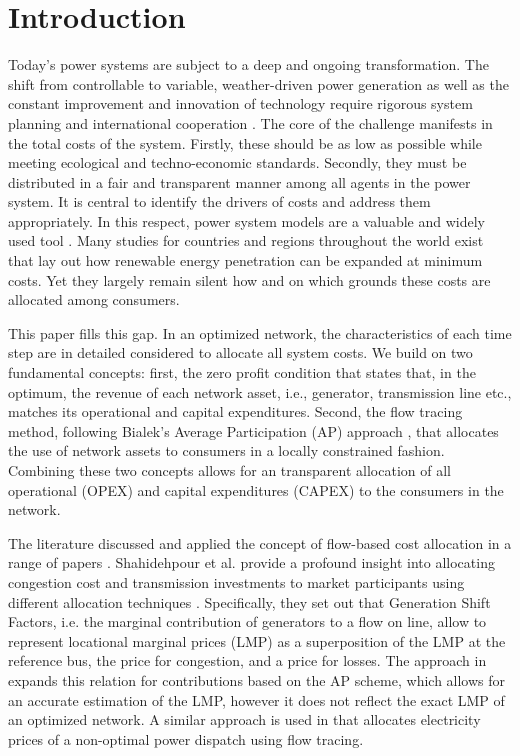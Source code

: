 \documentclass[11pt,twocolumn]{article}
\begin{document}
\section{Introduction}

Today's power systems are subject to a deep and ongoing transformation. The shift from controllable to variable, weather-driven power generation as well as the constant improvement and innovation of technology require rigorous system planning and international cooperation \cite{pfenninger_energy_2014,schlachtberger_benefits_2017}. The core of the challenge manifests in the total costs of the system. Firstly, these should be as low as possible while meeting ecological and techno-economic standards. Secondly, they must be distributed in a fair and transparent manner among all agents in the power system. It is central to identify the drivers of costs and address them appropriately.  
In this respect, power system models are a valuable and widely used tool \cite{pfenninger_energy_2014,bazmi_sustainable_2011,pereira_generation_2017,brown_sectoral_2019}. Many studies for countries and regions throughout the world exist that lay out how renewable energy penetration can be expanded at minimum costs. Yet they largely remain silent how and on which grounds these costs are allocated among consumers. 

This paper fills this gap. In an optimized network, the characteristics of each time step are in detailed considered to allocate all system costs. We build on two fundamental concepts: first, the zero profit condition that states that, in the optimum, the revenue of each network asset, i.e., generator, transmission line etc., matches its operational and capital expenditures. Second, the flow tracing method, following Bialek’s Average Participation (AP) approach \cite{bialek_tracing_1996}, that allocates the use of network assets to consumers in a locally constrained fashion. 
Combining these two concepts allows for an transparent allocation of all operational (OPEX) and capital expenditures (CAPEX) to the consumers in the network. 
 
The literature discussed and applied the concept of flow-based cost allocation in a range of papers \cite{galiana_transmission_2003,shahidehpour_market_2002,meng_investigation_2007,schafer_allocation_2017,nikoukar_transmission_2012,arabali_pricing_2012,wu_locational_2005}. Shahidehpour et al. provide a profound insight into allocating congestion cost and transmission investments to market participants using different allocation techniques \cite{shahidehpour_market_2002}. Specifically, they set out that Generation Shift Factors, i.e. the marginal contribution of generators to a flow on line, allow to represent locational marginal prices (LMP) as a superposition of the LMP at the reference bus, the price for congestion, and a price for losses. The approach in \cite{meng_investigation_2007} expands this relation for contributions based on the AP scheme, which allows for an accurate estimation of the LMP, however it does not reflect the exact LMP of an optimized network. A similar approach is used in \cite{schafer_allocation_2017} that allocates electricity prices of a non-optimal power dispatch using flow tracing.
\end{document}
